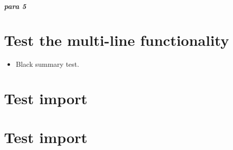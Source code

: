 \paragraph{para 5}
\label{autosec:7}
\chapter{Test the multi-line functionality}
\label{autosec:7}
    \begin{itemize}[noitemsep]
        \item Black summary test.
    \end{itemize}
\chapter{Test import}
\label{autosec:8}
\vspace{-36pt}\hspace{11pt}
\chapter{Test import}
\label{autosec:9}
\vspace{-36pt}\hspace{11pt}

